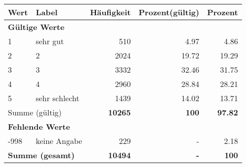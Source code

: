     \begin{longtable}{lXrrr}
     \toprule
     \textbf{Wert} & \textbf{Label} & \textbf{Häufigkeit} & \textbf{Prozent(gültig)} & \textbf{Prozent} \\
     \endhead
     \midrule
     \multicolumn{5}{l}{\textbf{Gültige Werte}}\\

     1 &
     \multicolumn{1}{X}{ sehr gut   } &


       \num{510} &
       \num[round-mode=places,round-precision=2]{4.97} &
         \num[round-mode=places,round-precision=2]{4.86} \\

     2 &
     \multicolumn{1}{X}{ 2   } &


       \num{2024} &
       \num[round-mode=places,round-precision=2]{19.72} &
         \num[round-mode=places,round-precision=2]{19.29} \\

     3 &
     \multicolumn{1}{X}{ 3   } &


       \num{3332} &
       \num[round-mode=places,round-precision=2]{32.46} &
         \num[round-mode=places,round-precision=2]{31.75} \\

     4 &
     \multicolumn{1}{X}{ 4   } &


       \num{2960} &
       \num[round-mode=places,round-precision=2]{28.84} &
         \num[round-mode=places,round-precision=2]{28.21} \\

     5 &
     \multicolumn{1}{X}{ sehr schlecht   } &


       \num{1439} &
       \num[round-mode=places,round-precision=2]{14.02} &
         \num[round-mode=places,round-precision=2]{13.71} \\
     \midrule
     \multicolumn{2}{l}{Summe (gültig)} &
       \textbf{\num{10265}} &
     \textbf{\num{100}} &
       \textbf{\num[round-mode=places,round-precision=2]{97.82}} \\
     \multicolumn{5}{l}{\textbf{Fehlende Werte}}\\
       -998 &
       keine Angabe &
         \num{229} &
        - &
         \num[round-mode=places,round-precision=2]{2.18} \\
     \midrule
     \multicolumn{2}{l}{\textbf{Summe (gesamt)}} &
          \textbf{\num{10494}} &
        \textbf{-} &
        \textbf{\num{100}} \\
     \bottomrule
     \end{longtable}
     
